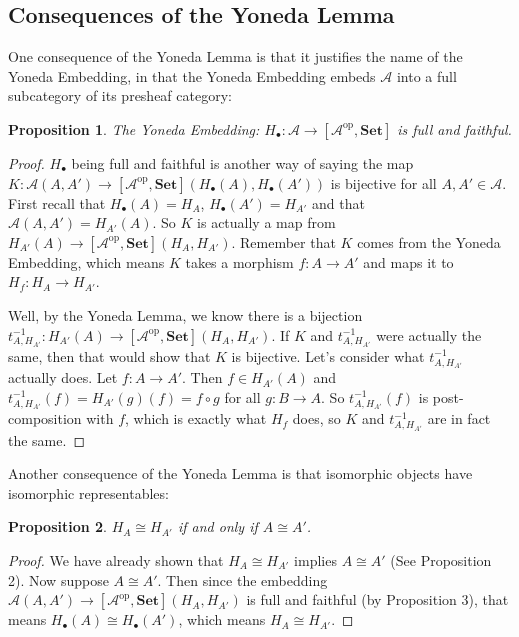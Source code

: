 \documentclass[11pt]{article}
\theoremstyle{definition}
\theoremstyle{definition}
\theoremstyle{plain}
\theoremstyle{plain}
\newtheorem{prop}{Proposition}
\theoremstyle{plain}
\begin{document}
\subsection*{Consequences of the Yoneda Lemma}

One consequence of the Yoneda Lemma is that it justifies the name of the Yoneda Embedding, in that the Yoneda Embedding embeds $\mathscr{A}$ into a full subcategory of its presheaf category:

\begin{prop}
The Yoneda Embedding: $H_{\bullet}: \mathscr{A} \to [\mathscr{A}^{\text{op}}, \textbf{Set}]$ is full and faithful.
\end{prop}

\begin{proof}
$H_{\bullet}$ being full and faithful is another way of saying the map $K: \mathscr{A}(A,A') \to [\mathscr{A}^{\text{op}}, \textbf{Set}](H_{\bullet}(A), H_{\bullet}(A'))$ is bijective for all $A,A' \in \mathscr{A}$. First recall that $H_{\bullet}(A) = H_A$, $H_{\bullet}(A') = H_{A'}$ and that $\mathscr{A}(A,A') = H_{A'}(A)$. So $K$ is actually a map from $H_{A'}(A) \to [\mathscr{A}^{\text{op}}, \textbf{Set}](H_A, H_{A'})$. Remember that $K$ comes from the Yoneda Embedding, which means $K$ takes a morphism $f: A \to A'$ and maps it to $H_f: H_A \to H_{A'}$.

Well, by the Yoneda Lemma, we know there is a bijection $t_{A,H_{A'}}^{-1}: H_{A'}(A) \to [\mathscr{A}^{\text{op}}, \textbf{Set}](H_A, H_{A'})$. If $K$ and $t_{A,H_{A'}}^{-1}$ were actually the same, then that would show that $K$ is bijective. Let's consider what $t_{A, H_{A'}}^{-1}$ actually does. Let $f: A \to A'$. Then $f \in H_{A'}(A)$ and $t_{A,H_{A'}}^{-1}(f) = H_{A'}(g)(f) = f \circ g$ for all $g: B \to A$. So $t_{A,H_{A'}}^{-1}(f)$ is post-composition with $f$, which is exactly what $H_f$ does, so $K$ and $t_{A,H_{A'}}^{-1}$ are in fact the same.
\end{proof}

Another consequence of the Yoneda Lemma is that isomorphic objects have isomorphic representables:

\begin{prop}
$H_A \cong H_{A'}$ if and only if $A \cong A'$.
\end{prop}

\begin{proof}
We have already shown that $H_A \cong H_{A'}$ implies $A \cong A'$ (See Proposition 2). Now suppose $A \cong A'$. Then since the embedding $\mathscr{A}(A, A') \to [\mathscr{A}^{\text{op}}, \textbf{Set}](H_A, H_{A'})$ is full and faithful (by Proposition 3), that means $H_{\bullet}(A) \cong H_{\bullet}(A')$, which means $H_A \cong H_{A'}$.
\end{proof}
\end{document}
